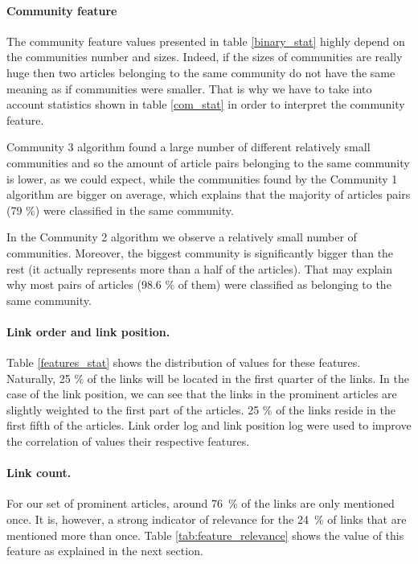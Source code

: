 \paragraph{Community feature}
The community feature values presented in table \ref{binary_stat} highly depend on the communities number and sizes. Indeed, if the sizes of communities are really huge then two articles belonging to the same community do not have the same meaning as if communities were smaller. That is why we have to take into account statistics shown in table \ref{com_stat} in order to interpret the community feature.

Community 3 algorithm found a large number of different relatively small communities and so the amount of article pairs belonging to the same community is lower, as we could expect, while the communities found by the Community 1 algorithm are bigger on average, which explains that the majority of articles pairs (79 \%) were classified in the same community.

In the Community 2 algorithm we observe a relatively small number of communities. Moreover, the biggest community is significantly bigger than the rest (it actually represents more than a half of the articles). That may explain why most pairs of articles (98.6 \% of them) were classified as belonging to the same community.


\paragraph{Link order and link position.}
Table \ref{features_stat} shows the distribution of values for these features. Naturally, 25 \% of the links will be located in the first quarter of the links. In the case of the link position, we can see that the links in the prominent articles are slightly weighted to the first part of the articles. 25 \% of the links reside in the first fifth of the articles. Link order log and link position log were used to improve the correlation of values their respective features.

\paragraph{Link count.}
For our set of prominent articles, around 76~\% of the links are only mentioned once. It is, however, a strong indicator of relevance for the 24~\% of links that are mentioned more than once. Table \ref{tab:feature_relevance} shows the value of this feature as explained in the next section.

